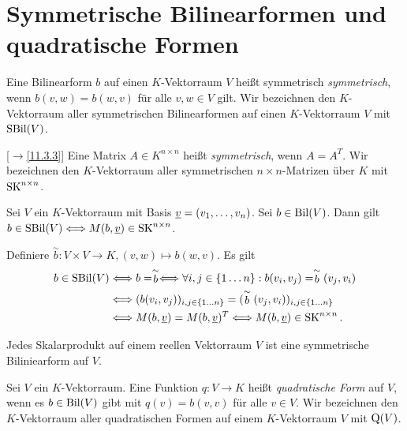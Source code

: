 \documentclass[../../main.tex]{subfiles}
\begin{document}
\section{Symmetrische Bilinearformen und quadratische Formen}

\begin{df}\label{13.4.1}
	Eine Bilinearform $b$ auf einen $K$-Vektorraum $V$ heißt symmetrisch \emph{symmetrisch}, wenn $b(v,w)=b(w,v)$ für alle $v,w\in V$ gilt. Wir bezeichnen den $K$-Vektorraum aller symmetrischen Bilinearformen auf einen $K$-Vektorraum $V$ mit $\operatorname{SBil}(V)$.
\end{df}	
	
\begin{df}\label{13.4.2}
	[$\to$\ref{11.3.3}] Eine Matrix $A\in K^{n\times n}$ heißt \emph{symmetrisch}, wenn $A=A^T$. Wir bezeichnen den $K$-Vektorraum aller symmetrischen $n\times n$-Matrizen über $K$ mit $\operatorname{SK}^{n\times n}$.
\end{df}
	
\begin{pro}\label{13.4.3}
	Sei $V$ ein $K$-Vektorraum mit Basis ${\underline v}=(v_1,\ldots ,v_n)$. Sei $b\in \operatorname{Bil}(V)$. Dann gilt $b\in \operatorname{SBil}(V)\Longleftrightarrow M(b,\underline{v})\in\operatorname{SK}^{n\times n}$.
\end{pro}
\begin{cproof}
	Definiere $\stackrel{\sim}{b}: V\times V\to K, (v,w)\mapsto b(w,v)$. Es gilt
	\begin{align*}
		b\in\operatorname{SBil}(V)&\Longleftrightarrow b=\stackrel{\sim}{b}\Longleftrightarrow \forall i,j\in\{1\ldots n\}: b(v_i,v_j)=\stackrel{\sim}{b}(v_j,v_i)\\
		&\Longleftrightarrow (b(v_i,v_j))_{i,j\in\{1\ldots n\}}=(\stackrel{\sim}{b}(v_j,v_i))_{i,j\in\{1\ldots n\}}\\
		&\Longleftrightarrow M(b,{\underline v})=M(b,{\underline v})^T\Longleftrightarrow M(b,{\underline v})\in\operatorname{SK}^{n\times n}.
	\end{align*}
\end{cproof}

\begin{bsp}\label{13.4.4}
	Jedes Skalarprodukt auf einem reellen Vektorraum $V$ ist eine symmetrische Biliniearform auf $V$.
\end{bsp}
	
\begin{df}\label{13.4.5} 
	Sei $V$ ein $K$-Vektorraum. Eine Funktion $q: V\to K$ heißt  \emph{quadratische Form} auf $V$, wenn es $b\in \operatorname{Bil}(V)$ gibt mit $q(v)=b(v,v)$ für alle $v\in V$. Wir bezeichnen den $K$-Vektorraum aller quadratischen Formen auf einem $K$-Vektorraum $V$ mit $\operatorname{Q}(V)$.
\end{df}
\end{document}
